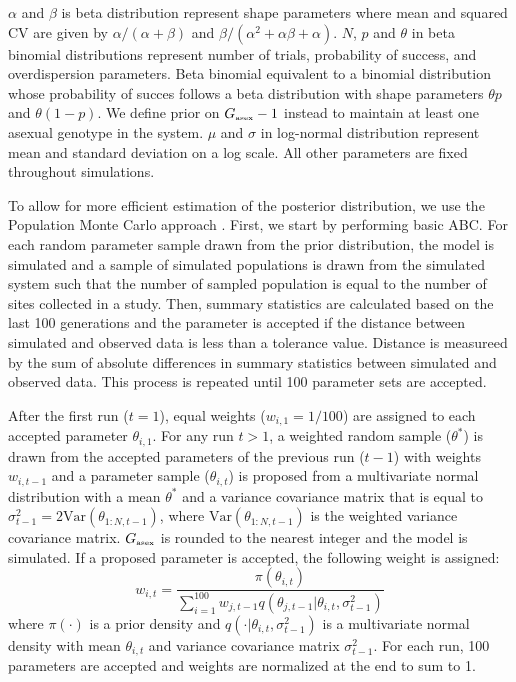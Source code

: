 \documentclass{article}\usepackage[]{graphicx}\usepackage[]{color}
\begin{document}
\begin{table}[h]
{$\alpha$ and $\beta$ is beta distribution represent shape parameters where mean and squared CV are given by $\alpha/(\alpha+\beta)$ and $\beta/(\alpha^2 + \alpha \beta + \alpha)$.
$N$, $p$ and $\theta$ in beta binomial distributions represent number of trials, probability of success, and overdispersion parameters. 
Beta binomial equivalent to a binomial distribution whose probability of succes follows a beta distribution with shape parameters $\theta p$ and $\theta (1-p)$.
We define prior on $G_{\textrm{\tiny asex}} -1$ instead to maintain at least one asexual genotype in the system.
$\mu$ and $\sigma$ in log-normal distribution represent mean and standard deviation on a log scale.
All other parameters are fixed throughout simulations.
}
\label{tb:param}
\end{table}

To allow for more efficient estimation of the posterior distribution, we use the Population Monte Carlo approach \cite{turner2012tutorial}.
First, we start by performing basic ABC.
For each random parameter sample drawn from the prior distribution, the model is simulated and a sample of simulated populations is drawn from the simulated system such that the number of sampled population is equal to the number of sites collected in a study.
Then, summary statistics are calculated based on the last 100 generations and the parameter is accepted if the distance between simulated and observed data is less than a tolerance value.
Distance is measureed by the sum of absolute differences in summary statistics between simulated and observed data.
This process is repeated until 100 parameter sets are accepted.

After the first run ($t=1$), equal weights ($w_{i,1}=1/100$) are assigned to each accepted parameter $\theta_{i, 1}$.
For any run $t > 1$,
a weighted random sample ($\theta^\ast$) is drawn from the accepted parameters of the previous run ($t-1$) with weights $w_{i,t-1}$ and
a parameter sample ($\theta_{i, t}$) is proposed from a multivariate normal distribution with a mean $\theta^\ast$ and a variance covariance matrix that is equal to $\sigma_{t-1}^2=2 \mathrm{Var}(\theta_{1:N, t-1})$, where $\mathrm{Var}(\theta_{1:N, t-1})$ is the weighted variance covariance matrix.
$G_{\textrm{\tiny asex}}$ is rounded to the nearest integer and the model is simulated.
If a proposed parameter is accepted, the following weight is assigned:
$$
w_{i,t} = \frac{\pi(\theta_{i, t})}{\sum_{i=1}^{100} w_{j, t-1} q(\theta_{j, t-1} | \theta_{i,t}, \sigma_{t-1}^2)}
$$
where $\pi(\cdot)$ is a prior density and $q(\cdot | \theta_{i,t}, \sigma_{t-1}^2)$ is a multivariate normal density with mean $\theta_{i,t}$ and variance covariance matrix $\sigma_{t-1}^2$.
For each run, 100 parameters are accepted and weights are normalized at the end to sum to 1.
\end{document}
